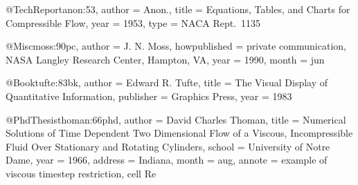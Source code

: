 @TechReport{anon:53,
  author = 	 {Anon.},
  title = 	 {Equations, Tables, and Charts for Compressible Flow},
  year = 	 1953,
  type =	 {NACA Rept.~1135}
}

@Misc{moss:90pc,
  author =	 {J. N. Moss},
  howpublished = {private communication,
                  NASA Langley Research Center,
                  Hampton, VA},
  year =	 1990,
  month =	 jun
}

@Book{tufte:83bk,
  author =	 {Edward R. Tufte},
  title = 	 {The Visual Display of Quantitative Information},
  publisher = 	 {Graphics Press},
  year = 	 1983
}

@PhdThesis{thoman:66phd,
  author = 	 {David Charles Thoman},
  title = 	 {Numerical Solutions of Time Dependent Two Dimensional
                  Flow of a Viscous, Incompressible Fluid Over
                  Stationary and Rotating Cylinders},
  school = 	 {University of Notre Dame},
  year = 	 1966,
  address =	 {Indiana},
  month =	 aug,
  annote =	 { example of viscous timestep restriction, cell Re }
}
